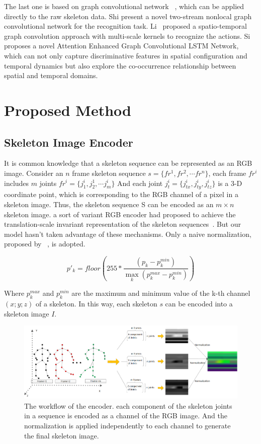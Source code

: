 \documentclass{bmvc2k}
\begin{document}
The last one is based on graph convolutional network ~\cite{bruna2013spectral}, which can be applied directly to the raw skeleton data. Shi\cite{shi2018non-local} present a novel two-stream nonlocal graph convolutional network for the recognition task. Li~\cite{li2018spatio} proposed a spatio-temporal graph convolution approach with multi-scale kernels to recognize the actions. Si\cite{si2019attention} proposes a novel Attention Enhanced Graph Convolutional LSTM Network, which can not only capture discriminative features in spatial configuration and temporal dynamics but also explore the co-occurrence relationship between spatial and temporal domains.
\section{Proposed Method}
\subsection*{Skeleton Image Encoder}
It is common knowledge that a skeleton sequence can be represented as an RGB image. Consider an $n$ frame skeleton sequence $s=\{ fr^1,fr^2,\cdots fr^n\}$, each frame $fr^i$ includes $m$ joints $fr^i =\{j^i_1,j^1_2,\cdots j^i_m\}$ And each joint $j^i_t=\{j^i_{tx},j^i_{ty},j^i_{tz}\}$  is a 3-D coordinate point, which is corresponding to the RGB channel of a pixel in a skeleton image. Thus, the skeleton sequence S can be encoded as an $m\times n$ skeleton image. a sort of variant RGB encoder had proposed to achieve the translation-scale invariant representation of the skeleton sequences~\cite{liu2017enhanced,ke2017new}. But our model hasn’t taken advantage of these mechanisms. Only a naive normalization, proposed by ~\cite{chen2015utd}, is adopted.

$$p'_k=floor(255*\frac{(p_k-p^{min}_k)}{\max \limits_{k}(p_k^{max}-p_k^{min})})$$

Where $p^{max}_k$ and $p^{min}_k$ are the maximum and minimum value of the k-th channel $(x; y; z)$ of a skeleton. In this way, each skeleton $s$ can be encoded into a skeleton image $I$. 

\begin{figure}[htb] 
	\centering
	\includegraphics[scale=0.25]{images/Figure_2.png}
	\caption{The workflow of the encoder. each component of the skeleton joints in a sequence is encoded as a channel of the RGB image. And the normalization is applied independently to each channel to generate the final skeleton image.}
	\label{fig:2}	
\end{figure}
\end{document}
